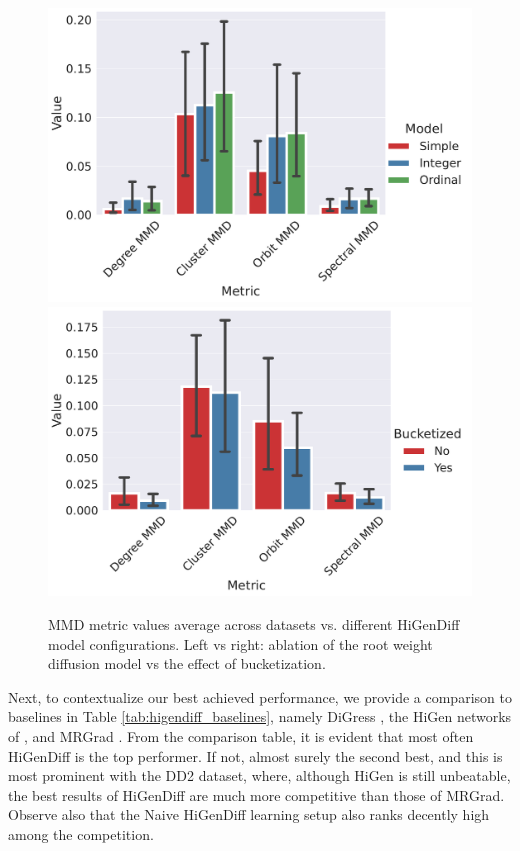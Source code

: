 \begin{figure}[H]
    \centering
    \includegraphics[width=0.475\linewidth]{figures/higendiff/ablation_model.pdf}
    \includegraphics[width=0.475\linewidth]{figures/higendiff/ablation_bucketized.pdf}
    \caption[MMD metric values vs. different HiGenDiff model configurations.]{MMD metric values average across datasets vs. different HiGenDiff model configurations. Left vs right: ablation of the root weight diffusion model vs the effect of bucketization.}
    \label{fig:higendiff_ablation}
\end{figure}

Next, to contextualize our best achieved performance, we provide a comparison to baselines in Table \ref{tab:higendiff_baselines}, namely DiGress \cite{vignac_digress_2022}, the HiGen networks of \cite{karami_higen_2024}, and MRGrad \cite{karami_multi-resolution_2024}. From the comparison table, it is evident that most often HiGenDiff is the top performer. If not, almost surely the second best, and this is most prominent with the DD2 dataset, where, although HiGen is still unbeatable, the best results of HiGenDiff are much more competitive than those of MRGrad. Observe also that the Naive HiGenDiff learning setup also ranks decently high among the competition.

